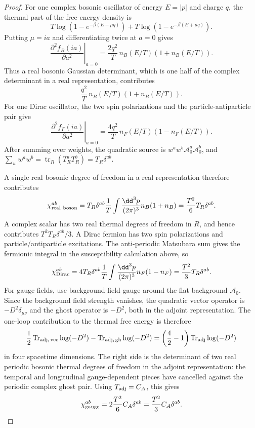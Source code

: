 \begin{proof}
For one complex bosonic oscillator of energy \(E=|p|\) and charge \(q\), the
thermal part of the free-energy density is
\[
  T\log\left(1-e^{-\beta(E-\mu q)}\right)
  +
  T\log\left(1-e^{-\beta(E+\mu q)}\right).
\]
Putting \(\mu=i a\) and differentiating twice at \(a=0\) gives
\[
  \left.\frac{\partial^2 f_B(i a)}{\partial a^2}\right|_{a=0}
  =
  \frac{2q^2}{T}\,n_B(E/T)(1+n_B(E/T)).
\]
Thus a real bosonic Gaussian determinant, which is one half of the complex
determinant in a real representation, contributes
\[
  \frac{q^2}{T}\,n_B(E/T)(1+n_B(E/T)).
\]
For one Dirac oscillator, the two spin polarizations and the
particle-antiparticle pair give
\[
  \left.\frac{\partial^2 f_F(i a)}{\partial a^2}\right|_{a=0}
  =
  \frac{4q^2}{T}\,n_F(E/T)(1-n_F(E/T)).
\]
After summing over weights, the quadratic source is
\(w^aw^b\mathcal A_0^a\mathcal A_0^b\), and
\(\sum_w w^aw^b=\operatorname{tr}_R(T^a_RT^b_R)=T_R\delta^{ab}\).

A single real bosonic degree of freedom in a real representation therefore
contributes
\begin{equation}
  \chi_{\rm real\ boson}^{ab}
  =
  T_R\delta^{ab}
  \frac1T\int\frac{\dd^3p}{(2\pi)^3}
  n_B(1+n_B)
  =
  \frac{T^2}{6}T_R\delta^{ab}.
  \label{eq:debye-real-boson-contribution}
\end{equation}
A complex scalar has two real thermal degrees of freedom in \(R\), and hence
contributes \(T^2T_R\delta^{ab}/3\).  A Dirac fermion has two spin
polarizations and particle/antiparticle excitations.  The anti-periodic
Matsubara sum gives the fermionic integral in
the susceptibility calculation above, so
\begin{equation}
  \chi_{\rm Dirac}^{ab}
  =
  4T_R\delta^{ab}
  \frac1T\int\frac{\dd^3p}{(2\pi)^3}
  n_F(1-n_F)
  =
  \frac{T^2}{3}T_R\delta^{ab}.
  \label{eq:debye-dirac-contribution}
\end{equation}
For gauge fields, use background-field gauge around the flat background
\(\mathcal A_0\).  Since the background field strength vanishes, the
quadratic vector operator is \(-D^2\delta_{\mu\nu}\) and the ghost operator is
\(-D^2\), both in the adjoint representation.  The one-loop contribution to
the thermal free energy is therefore
\[
  \frac12\operatorname{Tr}_{\rm adj,\,vec}\log(-D^2)
  -\operatorname{Tr}_{\rm adj,\,gh}\log(-D^2)
  =
  \left(\frac{4}{2}-1\right)\operatorname{Tr}_{\rm adj}\log(-D^2)
\]
in four spacetime dimensions.  The right side is the determinant of two real
periodic bosonic thermal degrees of freedom in the adjoint representation:
the temporal and longitudinal gauge-dependent pieces have cancelled against
the periodic complex ghost pair.  Using \(T_{\rm adj}=C_A\), this gives
\begin{equation}
  \chi_{\rm gauge}^{ab}
  =
  2\frac{T^2}{6}C_A\delta^{ab}
  =
  \frac{T^2}{3}C_A\delta^{ab}.
  \label{eq:debye-gauge-contribution}
\end{equation}


\end{proof}
